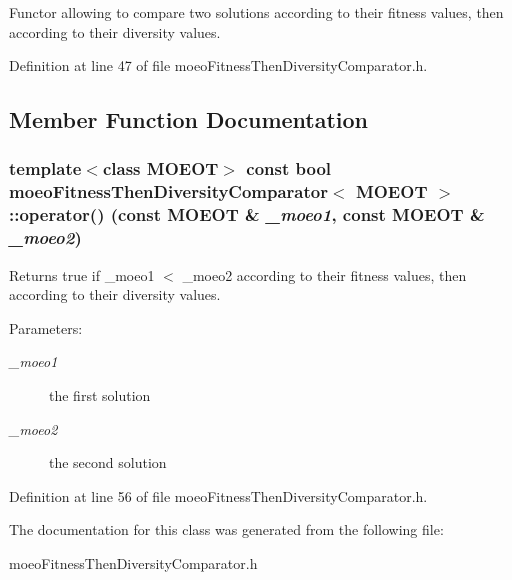 Functor allowing to compare two solutions according to their fitness values, then according to their diversity values. 



Definition at line 47 of file moeo\-Fitness\-Then\-Diversity\-Comparator.h.

\subsection{Member Function Documentation}
\subsubsection{\setlength{\rightskip}{0pt plus 5cm}template$<$class MOEOT$>$ const bool \bf{moeo\-Fitness\-Then\-Diversity\-Comparator}$<$ MOEOT $>$::operator() (const MOEOT \& {\em \_\-moeo1}, const MOEOT \& {\em \_\-moeo2})\hspace{0.3cm}{\tt  [inline]}}\label{classmoeoFitnessThenDiversityComparator_087856d1a7d81f242e95591d694e3ef6}


Returns true if \_\-moeo1 $<$ \_\-moeo2 according to their fitness values, then according to their diversity values. 

\begin{Desc}
\item[Parameters:]
\begin{description}
\item[{\em \_\-moeo1}]the first solution \item[{\em \_\-moeo2}]the second solution \end{description}
\end{Desc}


Definition at line 56 of file moeo\-Fitness\-Then\-Diversity\-Comparator.h.

The documentation for this class was generated from the following file:\begin{CompactItemize}
\item 
moeo\-Fitness\-Then\-Diversity\-Comparator.h\end{CompactItemize}

